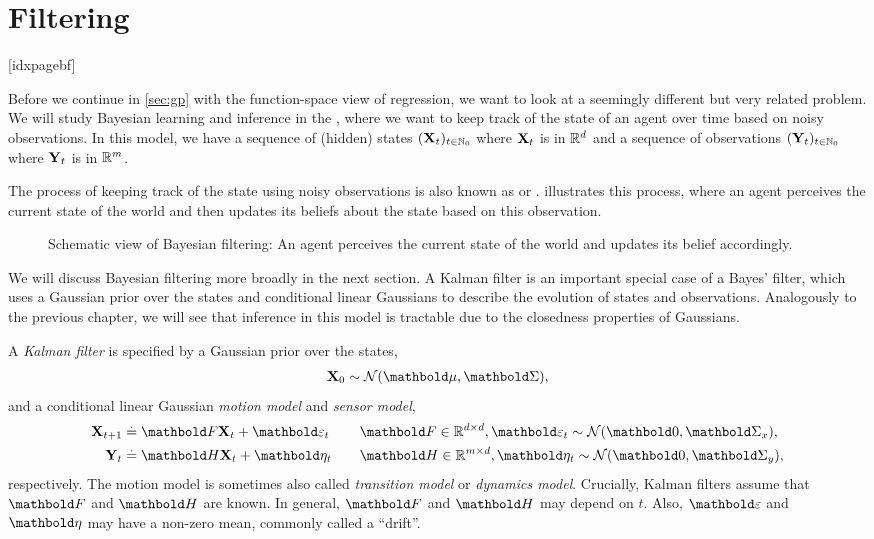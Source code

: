\chapter{Filtering}\label{sec:kf}[idxpagebf]

Before we continue in \cref{sec:gp} with the function-space view of regression, we want to look at a seemingly different but very related problem.
We will study Bayesian learning and inference in the , where we want to keep track of the state of an agent over time based on noisy observations.
In this model, we have a sequence of (hidden) states $(\mathbf{X}_t)_{t\in\mathbb{N}_0}$ where $\mathbf{X}_t$ is in $\mathbb{R}^d$ and a sequence of observations $(\mathbf{Y}_t)_{t\in\mathbb{N}_0}$ where $\mathbf{Y}_t$ is in $\mathbb{R}^m$.%

The process of keeping track of the state using noisy observations is also known as  or .
 illustrates this process, where an agent perceives the current state of the world and then updates its beliefs about the state based on this observation.

\begin{figure}
  \caption{Schematic view of Bayesian filtering: An agent perceives the current state of the world and updates its belief accordingly.}
  \label{fig:bayesian_filtering}
\end{figure}

We will discuss Bayesian filtering more broadly in the next section.
A Kalman filter is an important special case of a Bayes' filter, which uses a Gaussian prior over the states and conditional linear Gaussians to describe the evolution of states and observations.
Analogously to the previous chapter, we will see that inference in this model is tractable due to the closedness properties of Gaussians.

\begin{defn}
  A \emph{Kalman filter} is specified by a Gaussian prior over the states, \begin{align}
    \rX_0 \sim \N{\vmu}{\mSigma},
  \end{align} and a conditional linear Gaussian \emph{motion model} and \emph{sensor model}, \begin{align}
    \rX_{t+1} &\defeq \mF \rX_t + \vvarepsilon_t \quad &&\mF \in \R^{d \times d}, \vvarepsilon_t \sim \N{\vzero}{\mSigma_x}, \label{eq:kf_motion_model} \\
    \rY_t     &\defeq \mH \rX_t + \veta_t \quad     &&\mH \in \R^{m \times d}, \veta_t \sim \N{\vzero}{\mSigma_y}, \label{eq:kf_sensor_model}
  \end{align} respectively.
  The motion model is sometimes also called \emph{transition model} or \emph{dynamics model}.
  Crucially, Kalman filters assume that $\mF$ and $\mH$ are known.
  In general, $\mF$ and $\mH$ may depend on $t$.
  Also, $\vvarepsilon$ and $\veta$ may have a non-zero mean, commonly called a ``drift''.
\end{defn}

